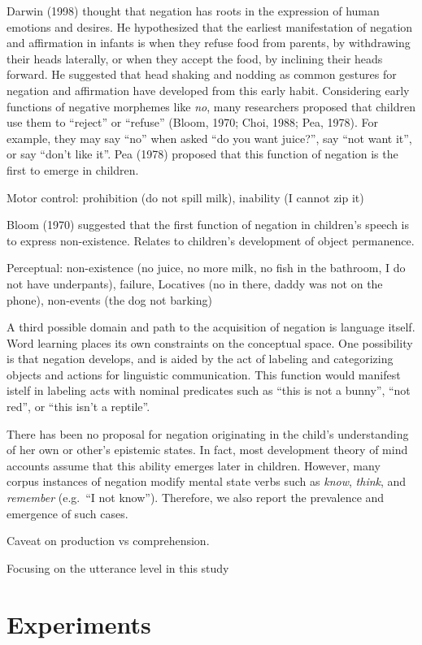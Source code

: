 \documentclass[10pt, letterpaper]{article}
\begin{document}
Darwin (1998) thought that negation has roots in the expression of human
emotions and desires. He hypothesized that the earliest manifestation of
negation and affirmation in infants is when they refuse food from
parents, by withdrawing their heads laterally, or when they accept the
food, by inclining their heads forward. He suggested that head shaking
and nodding as common gestures for negation and affirmation have
developed from this early habit. Considering early functions of negative
morphemes like \emph{no}, many researchers proposed that children use
them to ``reject'' or ``refuse'' (Bloom, 1970; Choi, 1988; Pea, 1978).
For example, they may say ``no'' when asked ``do you want juice?'', say
``not want it'', or say ``don't like it''. Pea (1978) proposed that this
function of negation is the first to emerge in children.

Motor control: prohibition (do not spill milk), inability (I cannot zip
it)

Bloom (1970) suggested that the first function of negation in children's
speech is to express non-existence. Relates to children's development of
object permanence.

Perceptual: non-existence (no juice, no more milk, no fish in the
bathroom, I do not have underpants), failure, Locatives (no in there,
daddy was not on the phone), non-events (the dog not barking)

A third possible domain and path to the acquisition of negation is
language itself. Word learning places its own constraints on the
conceptual space. One possibility is that negation develops, and is
aided by the act of labeling and categorizing objects and actions for
linguistic communication. This function would manifest istelf in
labeling acts with nominal predicates such as ``this is not a bunny'',
``not red'', or ``this isn't a reptile''.

There has been no proposal for negation originating in the child's
understanding of her own or other's epistemic states. In fact, most
development theory of mind accounts assume that this ability emerges
later in children. However, many corpus instances of negation modify
mental state verbs such as \emph{know}, \emph{think}, and
\emph{remember} (e.g.~``I not know''). Therefore, we also report the
prevalence and emergence of such cases.

Caveat on production vs comprehension.

Focusing on the utterance level in this study

\hypertarget{experiments}{%
\section{Experiments}\label{experiments}}
\end{document}
